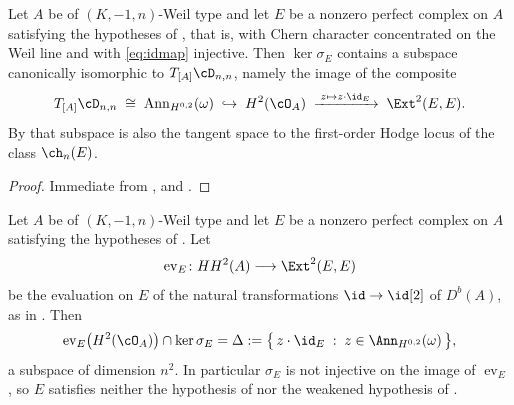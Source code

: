 \begin{corollary}
\label{cor:kernelfamily}
Let $A$ be of $(K,-1,n)$-Weil type and let $E$ be a nonzero perfect complex on
$A$ satisfying the hypotheses of , that is, with Chern
character concentrated on the Weil line and with \eqref{eq:idmap} injective.
Then $\ker\sigma_{E}$ contains a subspace canonically isomorphic to
$T_{[A]}\cD_{n,n}$, namely the image of the composite
\[
  T_{[A]}\cD_{n,n}\;\cong\;\operatorname{Ann}_{H^{0,2}}(\omega)
  \;\hookrightarrow\;H^{2}(\cO_{A})\;\xrightarrow{\;z\mapsto z\cdot\id_{E}\;}\;
  \Ext^{2}(E,E).
\]
By  that subspace is also the tangent space to the
first-order Hodge locus of the class $\ch_{n}(E)$.
\end{corollary}

\begin{proof}
Immediate from ,  and
.
\end{proof}

\begin{theorem}\label{thm:weakfails}
Let $A$ be of $(K,-1,n)$-Weil type and let $E$ be a nonzero perfect complex on
$A$ satisfying the hypotheses of . Let
\[
  \operatorname{ev}_{E}\colon HH^{2}(A)\longrightarrow\Ext^{2}(E,E)
\]
be the evaluation on $E$ of the natural transformations $\id\to\id[2]$ of
$D^{b}(A)$, as in \cite[Section 11.4]{Mar25b}. Then
\[
  \operatorname{ev}_{E}\bigl(H^{2}(\cO_{A})\bigr)\cap\ker\sigma_{E}
  =\Delta:=\bigl\{\,z\cdot\id_{E}\;:\;z\in\Ann_{H^{0,2}}(\omega)\,\bigr\},
\]
a subspace of dimension $n^{2}$. In particular $\sigma_{E}$ is not injective
on the image of $\operatorname{ev}_{E}$, so $E$ satisfies neither the
hypothesis of \cite[Lemma 11.3]{Mar25b} nor the weakened hypothesis of
\cite[Question 11.4]{Mar25b}.
\end{theorem}

